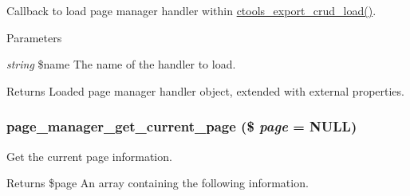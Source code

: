 Callback to load page manager handler within \hyperlink{group__export__crud_gafdb2a891145f268c573653fe61c79fa3}{ctools\_\-export\_\-crud\_\-load()}.


\begin{DoxyParams}{Parameters}
\item[{\em string}]\$name The name of the handler to load.\end{DoxyParams}
\begin{DoxyReturn}{Returns}
Loaded page manager handler object, extended with external properties. 
\end{DoxyReturn}
\hypertarget{page__manager_8module_a2f7eaa17ced7d0447b77cf272e7f42a3}{
\subsubsection[{page\_\-manager\_\-get\_\-current\_\-page}]{\setlength{\rightskip}{0pt plus 5cm}page\_\-manager\_\-get\_\-current\_\-page (\$ {\em page} = {\ttfamily NULL})}}
\label{page__manager_8module_a2f7eaa17ced7d0447b77cf272e7f42a3}
Get the current page information.

\begin{DoxyReturn}{Returns}
\$page An array containing the following information.
\end{DoxyReturn}

